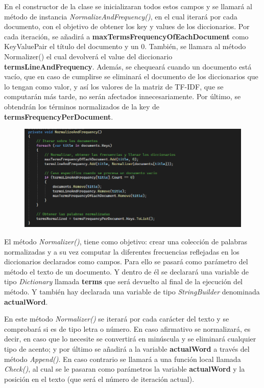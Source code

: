 \documentclass[a4paper,12pt]{report}
\begin{document}
En el constructor de la clase se inicializaran todos estos campos y se llamará al método de instancia
\textit{NormalizeAndFrequency()}, en el cual iterará por cada documento, con el objetivo de obtener los key
y values de los diccionarios. Por cada iteración, se añadirá a \textbf{maxTermsFrequencyOfEachDocument}
como KeyValuePair el título del documento y un 0. También, se llamara al método Normalizer() el
cual devolverá el value del diccionario \textbf{termsLineAndFrequency}. Además, se chequeará cuando un
documento está vacío, que en caso de cumplirse se eliminará el documento de los diccionarios que
lo tengan como valor, y así los valores de la matriz de TF-IDF, que se computarán más tarde, no serán
afectados innecesariamente. Por último, se obtendrán los términos normalizados de la key de
\textbf{termsFrequencyPerDocument}.

\begin{figure}[h]
    \includegraphics*[width=16cm]{fotos/04 - NormaliceAndFrequency.png}
\end{figure}

\newpage

El método \textit{Normalizer()}, tiene como objetivo: crear una colección de palabras normalizadas y a su vez
computar la diferentes frecuencias reflejadas en los diccionarios declarados como campos. Para ello
se pasará como parámetro del método el texto de un documento. Y dentro de él se declarará una
variable de tipo \textit{Dictionary} llamada \textbf{terms} que será devuelto al final de la ejecución del método. Y
también hay declarada una variable de tipo \textit{StringBuilder} denominada \textbf{actualWord}.

En este método \textit{Normalizer()} se iterará por cada carácter del texto y se comprobará si es de tipo letra
o número. En caso afirmativo se normalizará, es decir, en caso que lo necesite se convertirá en
minúscula y se eliminará cualquier tipo de acento; y por último se añadirá a la variable \textbf{actualWord}
a través del método \textit{Append()}. En caso contrario se llamará a una función local llamada \textit{Check()}, al
cual se le pasaran como parámetros la variable \textbf{actualWord} y la posición en el texto (que será el
número de iteración actual).
\end{document}
